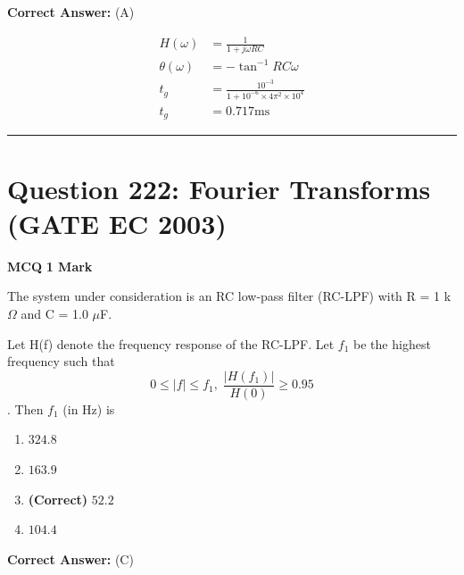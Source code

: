 \documentclass[11pt,a4paper]{article}
\begin{document}
\noindent \textbf{Correct Answer:} (A)

\begin{tcolorbox}[solbox, title=Detailed Solution -- Question 221]
\[
\begin{aligned}
H(\omega) &=\frac{1}{1+j \omega R C} \\
\theta(\omega) &=-\tan ^{-1} R C \omega \\
t_{g} &=\frac{10^{-3}}{1+10^{-6} \times 4 \pi^{2} \times 10^{4}} \\
t_{g} &=0.717 \mathrm{ms}
\end{aligned}
\]
\end{tcolorbox}

\vspace{1.5em}
\hrule
\vspace{1.5em}

\section*{Question 222: Fourier Transforms (GATE EC 2003)}
\noindent \textbf{\color{primary}MCQ} \hfill \textbf{\color{secondary}1 Mark}


\noindent The system under consideration is an RC low-pass filter (RC-LPF) with R = 1 k$\Omega$ and C = 1.0 $\mu$F. 

Let H(f) denote the frequency response of the RC-LPF. Let $f_{1}$ be the highest frequency such that 
\[
0\leq \left | f \right |\leq f_{1}, \; \frac{\left | H\left ( f_{1} \right ) \right |}{H(0)}\geq 0.95
\]
. Then $f_{1}$ (in Hz) is


\begin{enumerate}[label=(\Alph*)]
    \item $324.8$
    \item $163.9$
    \item \textbf{(Correct)} $52.2$
    \item $104.4$
\end{enumerate}

\noindent \textbf{Correct Answer:} (C)
\end{document}
